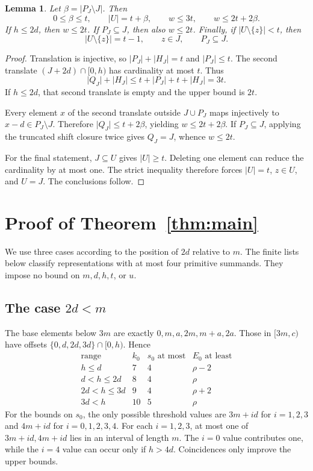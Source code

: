 \documentclass[11pt]{article}
\newtheorem{lemma}[theorem]{Lemma}
\newcommand{\card}[1]{\lvert #1\rvert}
\begin{document}
\begin{lemma}\label{lem:shifts}
Let $\beta=\card{P_J\setminus J}$. Then
\[
 0\leq\beta\leq t,\qquad \card U=t+\beta,
 \qquad w\leq3t,\qquad w\leq2t+2\beta.
\]
If $h\leq2d$, then $w\leq2t$.
If $P_J\subseteq J$, then also $w\leq2t$.
Finally, if $\card{U\setminus\{z\}}<t$, then
\[
 \card{U\setminus\{z\}}=t-1,\qquad z\in J,\qquad P_J\subseteq J.
\]
\end{lemma}
\begin{proof}
Translation is injective, so $\card{P_J}+\card{H_J}=t$ and
$\card{P_J}\leq t$. The second translate $(J+2d)\cap[0,h)$ has
cardinality at most $t$. Thus
\[
 \card{Q_J}+\card{H_J}
 \leq t+\card{P_J}+t+\card{H_J}=3t.
\]
If $h\leq2d$, that second translate is empty and the upper bound is $2t$.

Every element $x$ of the second translate outside $J\cup P_J$ maps
injectively to $x-d\in P_J\setminus J$. Therefore
$\card{Q_J}\leq t+2\beta$, yielding $w\leq2t+2\beta$.
If $P_J\subseteq J$, applying the truncated shift closure twice gives
$Q_J=J$, whence $w\leq2t$.

For the final statement, $J\subseteq U$ gives $\card U\geq t$.
Deleting one element can reduce the cardinality by at most one.
The strict inequality therefore forces $\card U=t$, $z\in U$, and
$U=J$. The conclusions follow.
\end{proof}

\section{Proof of Theorem~\ref{thm:main}}

We use three cases according to the position of $2d$ relative to $m$.
The finite lists below classify representations with at most four
primitive summands. They impose no bound on $m,d,h,t$, or $u$.

\subsection{The case \(2d<m\)}

The base elements below $3m$ are exactly
$0,m,a,2m,m+a,2a$. Those in $[3m,c)$ have offsets
$\{0,d,2d,3d\}\cap[0,h)$. Hence
\[
\begin{array}{c|c|c|c}
\text{range}&k_0&s_0\text{ at most}&E_0\text{ at least}\\ \hline
h\leq d&7&4&\rho-2\\
d<h\leq2d&8&4&\rho\\
2d<h\leq3d&9&4&\rho+2\\
3d<h&10&5&\rho
\end{array}
\]
For the bounds on $s_0$, the only possible threshold values are
$3m+i d$ for $i=1,2,3$ and $4m+i d$ for $i=0,1,2,3,4$.
For each $i=1,2,3$, at most one of $3m+i d,4m+i d$ lies in an interval
of length $m$. The $i=0$ value contributes one, while the $i=4$ value
can occur only if $h>4d$. Coincidences only improve the upper bounds.
\end{document}
